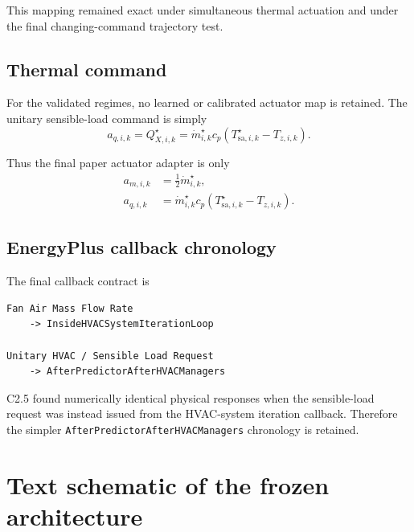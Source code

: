 \documentclass[11pt]{article}
\newcommand{\mdot}{\dot m}
\begin{document}
This mapping remained exact under simultaneous thermal actuation and under the
final changing-command trajectory test.

\subsection{Thermal command}

For the validated regimes, no learned or calibrated actuator map is retained.
The unitary sensible-load command is simply
\begin{equation}
\boxed{
a_{q,i,k}
=
Q_{X,i,k}^{\star}
=
\mdot_{i,k}^{\star}c_p
\left(
T_{\mathrm{sa},i,k}^{\star}
-
T_{z,i,k}
\right).
}
\label{eq:simple-thermal-command}
\end{equation}

Thus the final paper actuator adapter is only
\begin{equation}
\boxed{
\begin{aligned}
a_{m,i,k}
&=
\tfrac12\mdot_{i,k}^{\star},\\
a_{q,i,k}
&=
\mdot_{i,k}^{\star}c_p
\left(
T_{\mathrm{sa},i,k}^{\star}
-
T_{z,i,k}
\right).
\end{aligned}}
\label{eq:frozen-adapter}
\end{equation}

\subsection{EnergyPlus callback chronology}

The final callback contract is
\begin{verbatim}
Fan Air Mass Flow Rate
    -> InsideHVACSystemIterationLoop

Unitary HVAC / Sensible Load Request
    -> AfterPredictorAfterHVACManagers
\end{verbatim}

C2.5 found numerically identical physical responses when the sensible-load
request was instead issued from the HVAC-system iteration callback.  Therefore
the simpler \texttt{AfterPredictorAfterHVACManagers} chronology is retained.

\section{Text schematic of the frozen architecture}
\end{document}
